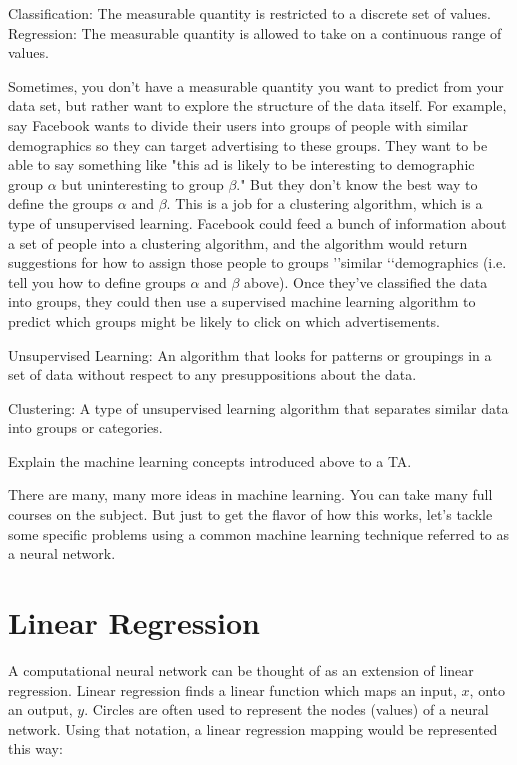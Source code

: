 Classification: The measurable quantity is restricted to a discrete set of values.
Regression: The measurable quantity is allowed to take on a continuous range of values.

Sometimes, you don\rq t have a measurable quantity you want to predict from your data set, but rather want to explore the structure of the data itself. For example, say Facebook wants to divide their users into groups of people with similar demographics so they can target advertising to these groups. They want to be able to say something like "this ad is likely to be interesting to demographic group $\alpha$ but uninteresting to group $\beta$." But they don\rq t know the best way to define the groups $\alpha$ and $\beta$. This is a job for a clustering algorithm, which is a type of unsupervised learning. Facebook could feed a bunch of information about a set of people into a clustering algorithm, and the algorithm would return suggestions for how to assign those people to groups \rq\rq similar \lq\lq demographics (i.e. tell you how to define groups $\alpha$ and $\beta$ above). Once they\rq ve classified the data into groups, they could then use a supervised machine learning algorithm to predict which groups might be likely to click on which advertisements.

Unsupervised Learning: An algorithm that looks for patterns or groupings in a set of data without respect to any presuppositions about the data.

Clustering: A type of unsupervised learning algorithm that separates similar data into groups or categories.


\begin{problem}\label{P13.1} Explain the machine learning concepts introduced above to a TA.\end{problem}
There are many, many more ideas in machine learning. You can take many full courses on the subject. But just to get the flavor of how this works, let\rq s tackle some specific problems using a common machine learning technique referred to as a neural network.


\section*{Linear Regression}

A computational neural network can be thought of as an extension of linear regression. Linear regression finds a linear function which maps an input, $x$, onto an output, $y$. Circles are often used to represent the nodes (values) of a neural network. Using that notation, a linear regression mapping would be represented this way:

